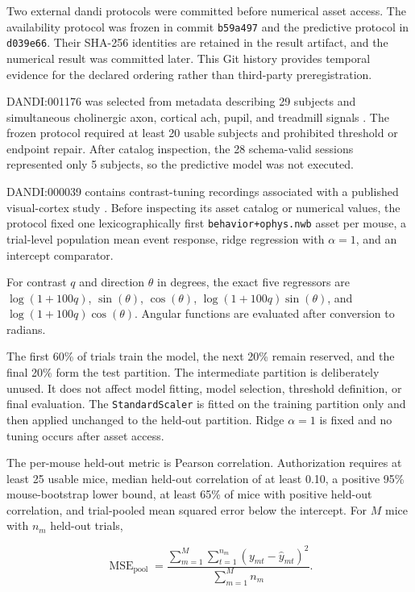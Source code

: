 \documentclass[11pt,a4paper]{article}
\begin{document}
Two external \ac{dandi} protocols were committed before numerical asset access. The availability protocol was frozen in commit \texttt{b59a497} and the predictive protocol in \texttt{d039e66}. Their SHA-256 identities are retained in the result artifact, and the numerical result was committed later.
This Git history provides temporal evidence for the declared ordering rather than third-party preregistration.

DANDI:001176 was selected from metadata describing 29 subjects and simultaneous cholinergic axon, cortical \ac{ach}, pupil, and treadmill signals \citep{neyhart2024ach}. The frozen protocol required at least 20 usable subjects and prohibited threshold or endpoint repair. After catalog inspection, the 28 schema-valid sessions represented only 5 subjects, so the predictive model was not executed.

DANDI:000039 contains contrast-tuning recordings associated with a published
visual-cortex study \citep{millman2020vip}. Before inspecting its asset
catalog or numerical values, the protocol fixed one lexicographically first
\texttt{behavior+ophys.nwb} asset per mouse, a trial-level population mean
event response, ridge regression with $\alpha=1$, and an intercept comparator.

For contrast $q$ and direction $\theta$ in degrees, the exact five regressors
are
$\log(1+100q)$,
$\sin(\theta)$,
$\cos(\theta)$,
$\log(1+100q)\sin(\theta)$, and
$\log(1+100q)\cos(\theta)$.
Angular functions are evaluated after conversion to radians.

The first 60\% of trials train the model, the next 20\% remain reserved, and
the final 20\% form the test partition. The intermediate partition is
deliberately unused. It does not affect model fitting, model selection,
threshold definition, or final evaluation. The \texttt{StandardScaler} is
fitted on the training partition only and then applied unchanged to the
held-out partition. Ridge $\alpha=1$ is fixed and no tuning occurs after
asset access.

The per-mouse held-out metric is Pearson correlation. Authorization requires
at least 25 usable mice, median held-out correlation of at least 0.10, a
positive 95\% mouse-bootstrap lower bound, at least 65\% of mice with
positive held-out correlation, and trial-pooled mean squared error below the
intercept. For $M$ mice with $n_m$ held-out trials,

\begin{equation}
\operatorname{MSE}_{\mathrm{pool}}=
\frac{
\sum_{m=1}^{M}
\sum_{t=1}^{n_m}
(y_{mt}-\widehat{y}_{mt})^2
}{
\sum_{m=1}^{M}n_m
}.
\label{eq:dandi-pooled-mse}
\end{equation}
\end{document}
